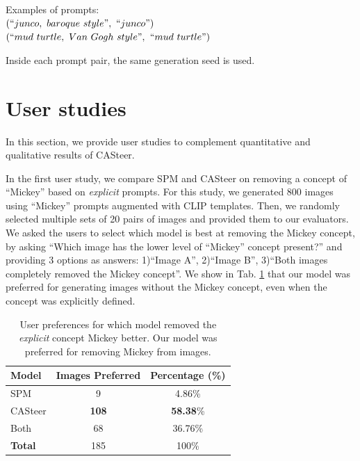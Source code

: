 \noindent Examples of prompts: \\
$(``junco,\ baroque\ style", \  ``junco")$\\
$(``mud\ turtle,\ Van\ Gogh\ style",$ $``mud\ turtle")$ 

\noindent Inside each prompt pair, the same generation seed is used. \\
% 
\clearpage


\section{User studies}
\label{sec:user_study}
In this section, we provide user studies to complement quantitative and qualitative results of CASteer. 

In the first user study, we compare SPM and CASteer on removing a concept of ``Mickey'' based on \textit{explicit} prompts. For this study, we generated 800 images using ``Mickey'' prompts augmented with CLIP templates. Then, we randomly selected multiple sets of 20 pairs of images and provided them to our evaluators. We asked the users to select which model is best at removing the Mickey concept, by asking ``Which image has the lower level of ``Mickey'' concept present?'' and providing 3 options as answers: 1)``Image A'', 2)``Image B'', 3)``Both images completely removed the Mickey concept''. We show in Tab. \ref{tab:explicit_mickey} that our model was preferred for generating images without the Mickey concept, even when the concept was explicitly defined.
\begin{table}[h!]
\centering

    \caption{User preferences for which model removed the \textit{explicit} concept Mickey better. Our model was preferred for removing Mickey from images.}
    \label{tab:explicit_mickey}
    \begin{tabular}{lcc}
    \hline
    \textbf{Model} & \textbf{Images Preferred} & \textbf{Percentage (\%)} \\
    \hline
    SPM & 9 & 4.86\% \\
    CASteer & \textbf{108} & \textbf{58.38}\% \\
    Both & 68 & 36.76\% \\
    \hline
    \textbf{Total} & 185 & 100\% \\
    \hline
    \end{tabular}
\end{table}

